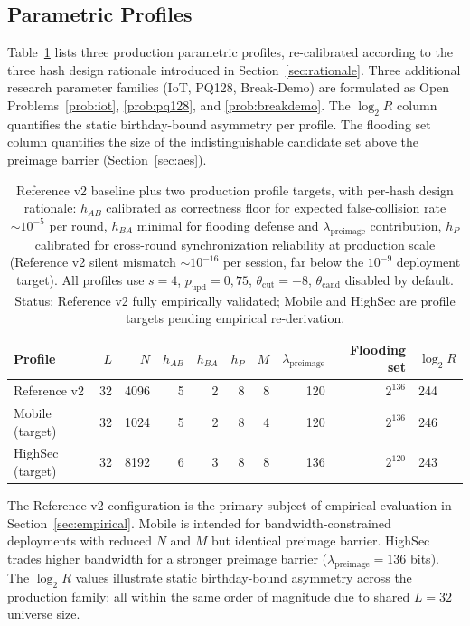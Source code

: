 \documentclass[11pt,a4paper]{article}
\begin{document}
\subsection{Parametric Profiles}\label{sec:profiles}

Table~\ref{tab:profiles} lists three production parametric profiles, re-calibrated according to the three hash design rationale introduced in Section~\ref{sec:rationale}. Three additional research parameter families (IoT, PQ128, Break-Demo) are formulated as Open Problems~\ref{prob:iot}, \ref{prob:pq128}, and \ref{prob:breakdemo}. The $\log_2 R$ column quantifies the static birthday-bound asymmetry per profile. The flooding set column quantifies the size of the indistinguishable candidate set above the preimage barrier (Section~\ref{sec:aes}).

\begin{table}[ht]
\centering
\small
\begin{tabular}{lrrrrrrrrl}
\toprule
Profile & $L$ & $N$ & $h_{AB}$ & $h_{BA}$ & $h_P$ & $M$ & $\lambda_\text{preimage}$ & Flooding set & $\log_2 R$ \\
\midrule
Reference v2 & 32 & 4096 & 5 & 2 & 8 & 8 & 120 & $2^{136}$ & 244 \\
Mobile (target) & 32 & 1024 & 5 & 2 & 8 & 4 & 120 & $2^{136}$ & 246 \\
HighSec (target) & 32 & 8192 & 6 & 3 & 8 & 8 & 136 & $2^{120}$ & 243 \\
\bottomrule
\end{tabular}
\caption{Reference v2 baseline plus two production profile targets, with per-hash design rationale: $h_{AB}$ calibrated as correctness floor for expected false-collision rate $\sim 10^{-5}$ per round, $h_{BA}$ minimal for flooding defense and $\lambda_\text{preimage}$ contribution, $h_P$ calibrated for cross-round synchronization reliability at production scale (Reference v2 silent mismatch $\sim 10^{-16}$ per session, far below the $10^{-9}$ deployment target). All profiles use $s = 4$, $p_\text{upd} = 0{,}75$, $\theta_{\text{cut}} = -8$, $\theta_{\text{cand}}$ disabled by default. Status: Reference v2 fully empirically validated; Mobile and HighSec are profile targets pending empirical re-derivation.}
\label{tab:profiles}
\end{table}

The Reference v2 configuration is the primary subject of empirical evaluation in Section~\ref{sec:empirical}. Mobile is intended for bandwidth-constrained deployments with reduced $N$ and $M$ but identical preimage barrier. HighSec trades higher bandwidth for a stronger preimage barrier ($\lambda_\text{preimage} = 136$ bits). The $\log_2 R$ values illustrate static birthday-bound asymmetry across the production family: all within the same order of magnitude due to shared $L = 32$ universe size.
\end{document}
